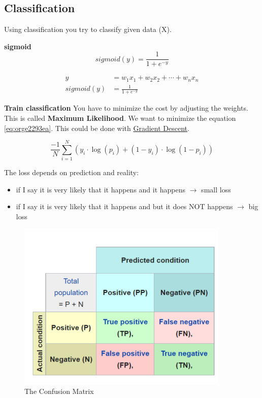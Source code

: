 \documentclass[11pt,twoside,landscape]{article}
\begin{document}
\begin{multicols}{3}
\section{Classification}
\label{sec:orgbbf7b4a}
Using classification you try to classify given data (X).

\textbf{sigmoid}
\begin{equation}
  sigmoid(y) = \frac{1}{1 + e^{-y}}
\end{equation}

\begin{align}
  y &= w_1x_1 + w_2x_2 + \cdots + w_nx_n \\
  sigmoid(y) &= \frac{1}{1 + e^{-y}}
\end{align}


\textbf{Train classification}
You have to minimize the cost by adjusting the weights.
This is called \textbf{Maximum Likelihood}.
We want to minimize the equation \ref{eq:orge2293ea}.
This could be done with \href{../../../roam/20211208163604-gradient_descent.org}{Gradient Descent}.

\begin{equation}
\label{eq:orge2293ea}
  \frac{-1}{N}\sum_{i=1}^{N}(y_i \cdot \log(p_i) + (1 - y_i)\cdot \log(1-p_i))
\end{equation}

The loss depends on prediction and reality:
\begin{itemize}
\item if I say it is very likely that it happens and it happens \(\rightarrow\) small loss
\item if I say it is very likely that it happens and but it does NOT happens \(\rightarrow\) big loss
\end{itemize}

\begin{figure}[htbp]
\centering
\includegraphics[width=.9\linewidth]{img/confusion_matrix.png}
\caption{The Confusion Matrix}
\end{figure}



\end{multicols}
\end{document}

